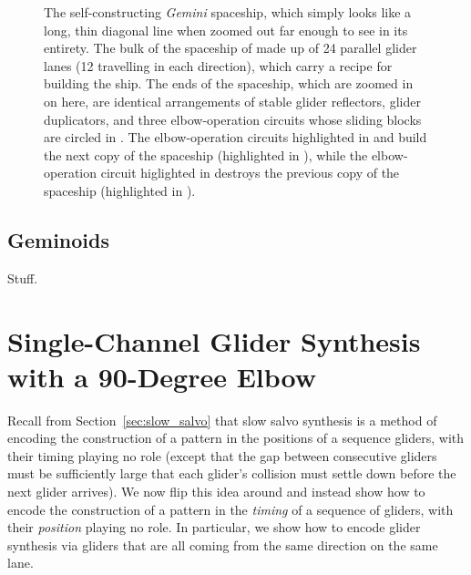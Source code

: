 \begin{figure}[!htbp]
	\centering
	\caption{The self-constructing \emph{Gemini} spaceship, which simply looks like a long, thin diagonal line when zoomed out far enough to see in its entirety. The bulk of the spaceship of made up of 24 parallel glider lanes (12 travelling in each direction), which carry a recipe for building the ship. The ends of the spaceship, which are zoomed in on here, are identical arrangements of stable glider reflectors, glider duplicators, and three elbow-operation circuits whose sliding blocks are circled in . The elbow-operation circuits highlighted in  and  build the next copy of the spaceship (highlighted in ), while the elbow-operation circuit higlighted in  destroys the previous copy of the spaceship (highlighted in ).}\label{fig:gemini}
\end{figure}


\subsection{Geminoids}\label{sec:geminoids}

Stuff.



\section{Single-Channel Glider Synthesis with a 90-Degree Elbow}\label{sec:single_channel_synth}

Recall from Section~\ref{sec:slow_salvo} that slow salvo synthesis is a method of encoding the construction of a pattern in the positions of a sequence gliders, with their timing playing no role (except that the gap between consecutive gliders must be sufficiently large that each glider's collision must settle down before the next glider arrives). We now flip this idea around and instead show how to encode the construction of a pattern in the \emph{timing} of a sequence of gliders, with their \emph{position} playing no role. In particular, we show how to encode glider synthesis via gliders that are all coming from the same direction on the same lane.


